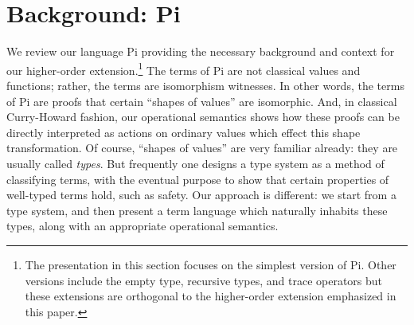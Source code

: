 \documentclass{llncs}
\newcommand{\roshan}[1]{}
\begin{document}
\section{Background: {{Pi}} }
\label{sec:pi}

We review our language {{Pi}} providing the necessary background and
context for our higher-order extension.\footnote{The presentation in this
  section focuses on the simplest version of {{Pi}}. Other versions
  include the empty type, recursive types, and trace operators but these
  extensions are orthogonal to the higher-order extension emphasized in this
  paper.} The terms of {{Pi}} are not classical values and functions;
rather, the terms are isomorphism witnesses.  In other words, the terms of
{{Pi}} are proofs that certain ``shapes of values'' are isomorphic.
And, in classical Curry-Howard fashion, our operational semantics shows how
these proofs can be directly interpreted as actions on ordinary values which
effect this shape transformation. Of course, ``shapes of values'' are very
familiar already: they are usually called \emph{types}.  But frequently one
designs a type system as a method of classifying terms, with the eventual
purpose to show that certain properties of well-typed terms hold, such as
safety.  Our approach is different: we start from a type system, and then
present a term language which naturally inhabits these types, along with an
appropriate operational semantics.

\roshan{In the above the, when we say that the terms of {{Pi}} are
  proofs that certain ``shapes of values'' are isomorphic, it is
  misleading. In {{langRev}}, the value {{left ()}} may or may not be
  isomorphic to the value {{right ()}} or {{left ()}} itself, or any
  other value of our choice. In particular the actual syntactic
  structure of the value has nothing to do with values being
  isomorphic. Values are just place-holders for the situations that
  their type represents. Their shapes have no intrinsic content. }


\roshan{Further, this is not to say that we may not be able to use the
  syntactic structure of a value for some purpose.  The prime use for
  such a thing might be, for example, to define a notion of distance
  between values -- such that values live in a metric space. Time and
  time again, we have felt the need for developing such an idea. Such
  a thing doesn't exist for the scope of this paper however. }
\end{document}
